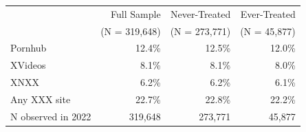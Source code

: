 \begin{tabular}{lrrr}
\toprule
 & Full Sample & Never-Treated & Ever-Treated \\
 & (N = 319,648) & (N = 273,771) & (N =  45,877) \\
\midrule
Pornhub & 12.4\% & 12.5\% & 12.0\% \\
XVideos & 8.1\% & 8.1\% & 8.0\% \\
XNXX & 6.2\% & 6.2\% & 6.1\% \\
Any XXX site & 22.7\% & 22.8\% & 22.2\% \\
\midrule
N observed in 2022 & 319,648 & 273,771 &  45,877 \\
\bottomrule
\end{tabular}
